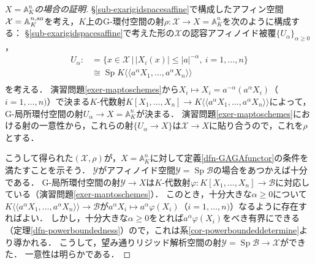 \documentclass[a4paper,12pt, dvipdfmx]{jsbook}
\def\A{\mathbb{A}}
\def\Sp{\mathop{\mathrm{Sp}}\nolimits}
\def\an{\textsl{an}}
\def\dl{\langle\!\langle}
\def\dr{\rangle\!\rangle}
\newcommand{\abs}[1]{\lvert#1\rvert}
\theoremstyle{plain}
\theoremstyle{definition}
\begin{document}
\begin{proof}[{\rm $X=\A^n_K$の場合の証明}]
\S\ref{sub-exarigidspacesaffine}で構成したアフィン空間$\mathcal{X}=\A^{n,\an}_K$を考え，$K$上のG-環付空間の射$\rho\colon\mathcal{X}\rightarrow X=\A^n_K$を次のように構成する：
\S\ref{sub-exarigidspacesaffine}で考えた形の$\mathcal{X}$の認容アフィノイド被覆$\{U_{\alpha}\}_{\alpha\geq 0}$，
\begin{equation*}
\begin{split}
U_{\alpha}:&=\{x\in\mathcal{X}\,|\,\abs{X_i(x)}\leq\abs{a}^{-\alpha},\ i=1,\ldots,n\}\\ &\cong\Sp K\dl a^{\alpha}X_1,\ldots,a^{\alpha}X_n\dr\\ 
\end{split}
\end{equation*}
を考える．
演習問題\ref{exer-maptoschemes}から$X_i\mapsto X_i=a^{-\alpha}(a^{\alpha}X_i)$（$i=1,\ldots,n)$）で決まる$K$-代数射$K[X_1,\ldots,X_n]\rightarrow K\dl a^{\alpha}X_1,\ldots,a^{\alpha}X_n\dr$によって，G-局所環付空間の射$U_{\alpha}\rightarrow X=\A^n_K$が決まる．
演習問題\ref{exer-maptoschemes}における射の一意性から，これらの射$\{U_{\alpha}\rightarrow X\}$は$\mathcal{X}\rightarrow X$に貼り合うので，これを$\rho$とする．

こうして得られた$(\mathcal{X},\rho)$が，$X=\A^n_K$に対して定義\ref{dfn-GAGAfunctor}の条件を満たすことを示そう．
$\mathcal{Y}$がアフィノイド空間$\mathcal{Y}=\Sp\mathcal{B}$の場合をあつかえば十分である．
G-局所環付空間の射$\mathcal{Y}\rightarrow X$は$K$-代数射$\varphi\colon K[X_1,\ldots,X_n]\rightarrow\mathcal{B}$に対応している（演習問題\ref{exer-maptoschemes}）．
このとき，十分大きな$\alpha\geq 0$について$K\dl a^{\alpha}X_1,\ldots,a^{\alpha}X_n\dr\rightarrow\mathcal{B}$が$a^{\alpha}X_i\mapsto a^{\alpha}\varphi(X_i)$（$i=1,\ldots,n)$）なるように存在すればよい．
しかし，十分大きな$\alpha\geq 0$をとれば$a^{\alpha}\varphi(X_i)$をべき有界にできる（定理\ref{dfn-powerboundedness}）ので，これは系\ref{cor-powerboundeddetermine}より導かれる．
こうして，望み通りリジッド解析空間の射$\mathcal{Y}=\Sp\mathcal{B}\rightarrow\mathcal{X}$ができた．
一意性は明らかである．


\end{proof}
\end{document}
